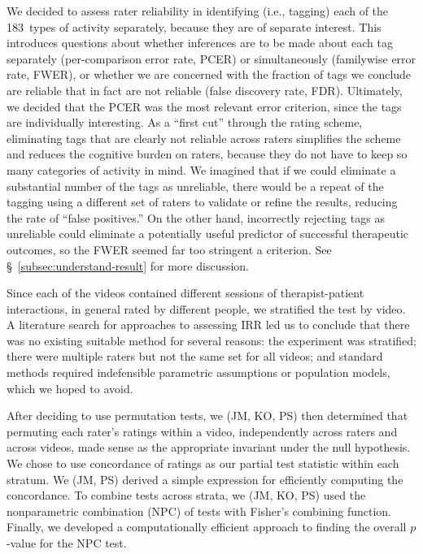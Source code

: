 \documentclass[]{article}
\begin{document}
We decided to assess rater reliability in identifying (i.e., tagging)
each of the 183~types of activity separately, because they
are of separate interest.
This introduces questions about whether inferences are to be made
about each tag separately (per-comparison error rate, PCER) or
simultaneously (familywise error rate, FWER), or whether we are
concerned with the fraction of tags we conclude are reliable that
in fact are not reliable (false discovery rate, FDR).
Ultimately, we decided that the PCER was the most relevant error
criterion, since the tags are individually interesting.
As a ``first cut'' through the rating scheme, eliminating tags that
are clearly not reliable across raters simplifies the scheme and
reduces the cognitive burden on raters, because they do not have
to keep so many categories of activity in mind.
We imagined that if we could eliminate a substantial number of the tags as unreliable,
there would be a repeat of the tagging using a different set of raters
to validate or refine the results, reducing the rate of ``false positives.''
On the other hand, incorrectly rejecting tags as unreliable could
eliminate a potentially useful predictor of successful therapeutic outcomes,
so the FWER seemed far too stringent a criterion.
See \S~\ref{subsec:understand-result} for more discussion.

Since each of the videos contained different sessions of therapist-patient
interactions, in general rated by different people, we stratified the test by video.
A literature search for approaches to assessing IRR led us to conclude that
there was no existing suitable method for several reasons:
the experiment was stratified;
there were multiple raters but not the same set for all videos;
and standard methods required indefensible parametric
assumptions or population models, which we hoped to avoid.

After deciding to use permutation tests, we (JM, KO, PS) then determined 
that permuting each rater's ratings within a
video, independently across raters and across videos, made sense as 
the appropriate invariant under the null hypothesis.
We chose to use concordance of ratings as our partial test statistic within
each stratum.
We (JM, PS) derived a simple expression for efficiently computing the
concordance.
To combine tests across strata, we (JM, KO, PS) used the nonparametric
combination (NPC) of tests \citep{pesarin2010permutation}
with Fisher's combining function.
Finally, we developed a computationally efficient approach to
finding the overall $p$-value for the NPC test.
\end{document}
